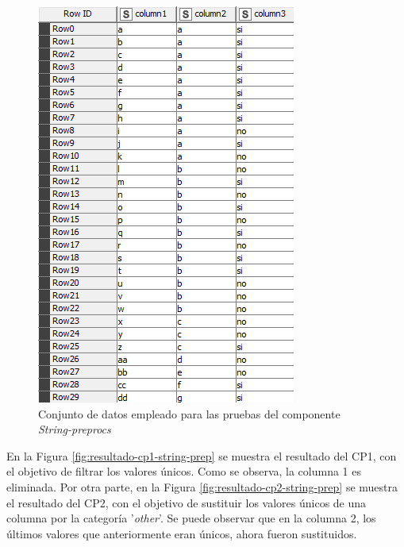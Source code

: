 \begin{figure}[H]
	\centering
	\includegraphics[width=0.3\linewidth]{"figuras/capi 3/pruebas-jenn/bd-string-preprocs"}
	\caption{Conjunto de datos empleado para las pruebas del componente \textit{String-preprocs}}
	\label{fig:bd-string-preprocs}
\end{figure}

En la Figura \ref{fig:resultado-cp1-string-prep} se muestra el resultado del CP1, con el objetivo de filtrar los valores únicos. Como se observa, la columna 1 es eliminada. Por otra parte, en la Figura \ref{fig:resultado-cp2-string-prep} se muestra el resultado del CP2, con el objetivo de sustituir los valores únicos de una columna por la categoría '\textit{other}'. Se puede observar que en la columna 2, los últimos valores que anteriormente eran únicos, ahora fueron sustituidos.

